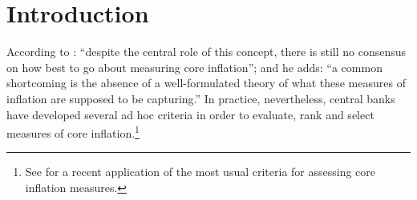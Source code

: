 \section{Introduction}


According to \textcite[p.~205]{wynne2008core}: ``despite the central role of this concept, there is still no consensus on how best to go about measuring core inflation''; and he adds: ``a common shortcoming is the absence of a well-formulated theory of what these measures of inflation are supposed to be capturing.'' In practice, nevertheless, central banks have developed several ad hoc criteria in order to evaluate, rank and select measures of core inflation.\footnote{See \textcite[p.~9-10]{bankofcanada2021renewal} for a recent application of the most usual criteria for assessing core inflation measures.}

\lipsum[1-2]